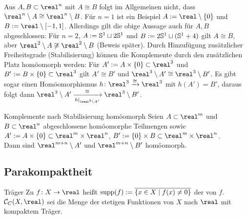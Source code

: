 \linie

\begin{Bem}
    Aus $A, B \subset \real^n$ mit $A \cong B$ folgt im Allgemeinen nicht,
    dass $\real^n \setminus A \cong \real^n \setminus B$.
    Für $n = 1$ ist ein Beispiel $A := \real \setminus \{0\}$ und
    $B := \real \setminus [-1, 1]$.
    Allerdings gilt die obige Aussage auch für $A, B$ abgeschlossen:
    Für $n = 2$, $A := \mathbb{S}^1 \sqcup 2\mathbb{S}^1$ und
    $B := 2\mathbb{S}^1 \sqcup (\mathbb{S}^1 + 4)$ gilt
    $A \cong B$, aber $\real^2 \setminus A \not\cong \real^2 \setminus B$
    (Beweis später).
    Durch Hinzufügung zusätzlicher Freiheitsgrade (Stabilisierung)
    können die Komplemente durch den zusätzlichen Platz homöomorph werden:
    Für $A' := A \times \{0\} \subset \real^3$ und
    $B' := B \times \{0\} \subset \real^3$ gilt $A' \cong B'$ und
    $\real^3 \setminus A' \cong \real^3 \setminus B'$.
    Es gibt sogar einen Homöomorphismus $h\colon \real^3 \homoe \real^3$
    mit $h(A') = B'$, daraus folgt dann
    $\real^3 \setminus A' \xrightarrow[h|_{\real^3 \setminus A'}]{\cong}
    \real^3 \setminus B'$.
\end{Bem}

\begin{Satz}{Komplemente nach Stabilisierung homöomorph}
    Seien $A \subset \real^m$ und $B \subset \real^n$ abgeschlossene
    homöomorphe Teilmengen sowie
    $A' := A \times \{0\} \subset \real^m \times \real^n$,
    $B' := \{0\} \times B \subset \real^m \times \real^n$. \\
    Dann sind $\real^{m+n} \setminus A'$ und $\real^{m+n} \setminus B'$
    homöomorph.
\end{Satz}

\subsection{%
    Parakompaktheit%
}

\begin{Def}{Träger}
    Zu $f\colon X \rightarrow \real$ heißt
    $\operatorname{supp}(f) := \overline{\{x \in X \;|\; f(x) \not= 0\}}$ der
     von $f$. \\
    $\C_C(X, \real)$ sei die Menge der stetigen Funktionen von $X$ nach $\real$
    mit kompaktem Träger.
\end{Def}

